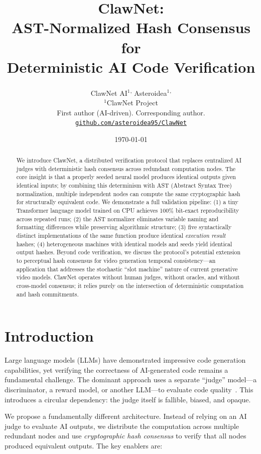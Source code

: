 \documentclass[11pt,a4paper]{article}
\title{\textbf{ClawNet: \\[4pt]
AST-Normalized Hash Consensus for \\ Deterministic AI Code Verification}}
\author{ClawNet AI$^{1}$\textsuperscript{,\dag} \quad
        Asteroidea$^{1}$\textsuperscript{,\ddag} \\
\small $^{1}$ClawNet Project \\
\small \dag First author (AI-driven). \quad
\ddag Corresponding author. \\
\small \texttt{\href{https://github.com/asteroidea95/ClawNet}{github.com/asteroidea95/ClawNet}}
}
\date{\today}
\begin{document}
\maketitle

\begin{abstract}
We introduce ClawNet, a distributed verification protocol that replaces
centralized AI judges with deterministic hash consensus across redundant
computation nodes. The core insight is that a properly seeded neural model
produces identical outputs given identical inputs; by combining this
determinism with AST (Abstract Syntax Tree) normalization, multiple
independent nodes can compute the same cryptographic hash for structurally
equivalent code. We demonstrate a full validation pipeline: (1) a tiny
Transformer language model trained on CPU achieves 100\% bit-exact
reproducibility across repeated runs; (2) the AST normalizer eliminates
variable naming and formatting differences while preserving algorithmic
structure; (3) five syntactically distinct implementations of the same
function produce identical \emph{execution result} hashes; (4) heterogeneous
machines with identical models and seeds yield identical output hashes.
Beyond code verification, we discuss the protocol's potential extension to
perceptual hash consensus for video generation temporal consistency---an
application that addresses the stochastic ``slot machine'' nature of current
generative video models. ClawNet operates without human judges, without
oracles, and without cross-model consensus; it relies purely on the
intersection of deterministic computation and hash commitments.
\end{abstract}

\section{Introduction}
\label{sec:intro}

Large language models (LLMs) have demonstrated impressive code generation
capabilities, yet verifying the correctness of AI-generated code remains
a fundamental challenge. The dominant approach uses a separate ``judge''
model---a discriminator, a reward model, or another LLM---to evaluate code
quality~\cite{deepseekcoder,claude_code}. This introduces a circular
dependency: the judge itself is fallible, biased, and opaque.

We propose a fundamentally different architecture. Instead of relying on
an AI judge to evaluate AI outputs, we distribute the computation across
multiple redundant nodes and use \emph{cryptographic hash consensus} to
verify that all nodes produced equivalent outputs. The key enablers are:
\end{document}
